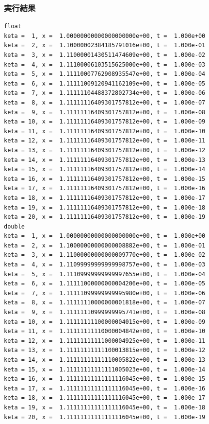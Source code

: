 \documentclass{jarticle}
\begin{document}
\subsubsection{実行結果\\}
\begin{breakbox}
\begin{verbatim}
float
keta =  1, x =  1.00000000000000000000e+00, t =  1.000e+00
keta =  2, x =  1.10000002384185791016e+00, t =  1.000e-01
keta =  3, x =  1.11000001430511474609e+00, t =  1.000e-02
keta =  4, x =  1.11100006103515625000e+00, t =  1.000e-03
keta =  5, x =  1.11110007762908935547e+00, t =  1.000e-04
keta =  6, x =  1.11111009120941162109e+00, t =  1.000e-05
keta =  7, x =  1.11111104488372802734e+00, t =  1.000e-06
keta =  8, x =  1.11111116409301757812e+00, t =  1.000e-07
keta =  9, x =  1.11111116409301757812e+00, t =  1.000e-08
keta = 10, x =  1.11111116409301757812e+00, t =  1.000e-09
keta = 11, x =  1.11111116409301757812e+00, t =  1.000e-10
keta = 12, x =  1.11111116409301757812e+00, t =  1.000e-11
keta = 13, x =  1.11111116409301757812e+00, t =  1.000e-12
keta = 14, x =  1.11111116409301757812e+00, t =  1.000e-13
keta = 15, x =  1.11111116409301757812e+00, t =  1.000e-14
keta = 16, x =  1.11111116409301757812e+00, t =  1.000e-15
keta = 17, x =  1.11111116409301757812e+00, t =  1.000e-16
keta = 18, x =  1.11111116409301757812e+00, t =  1.000e-17
keta = 19, x =  1.11111116409301757812e+00, t =  1.000e-18
keta = 20, x =  1.11111116409301757812e+00, t =  1.000e-19
double
keta =  1, x =  1.00000000000000000000e+00, t =  1.000e+00
keta =  2, x =  1.10000000000000008882e+00, t =  1.000e-01
keta =  3, x =  1.11000000000000009770e+00, t =  1.000e-02
keta =  4, x =  1.11099999999999998757e+00, t =  1.000e-03
keta =  5, x =  1.11109999999999997655e+00, t =  1.000e-04
keta =  6, x =  1.11111000000000004206e+00, t =  1.000e-05
keta =  7, x =  1.11111099999999995980e+00, t =  1.000e-06
keta =  8, x =  1.11111110000000001818e+00, t =  1.000e-07
keta =  9, x =  1.11111110999999995741e+00, t =  1.000e-08
keta = 10, x =  1.11111111100000004015e+00, t =  1.000e-09
keta = 11, x =  1.11111111110000004842e+00, t =  1.000e-10
keta = 12, x =  1.11111111111000004925e+00, t =  1.000e-11
keta = 13, x =  1.11111111111100013815e+00, t =  1.000e-12
keta = 14, x =  1.11111111111110005822e+00, t =  1.000e-13
keta = 15, x =  1.11111111111111005023e+00, t =  1.000e-14
keta = 16, x =  1.11111111111111116045e+00, t =  1.000e-15
keta = 17, x =  1.11111111111111116045e+00, t =  1.000e-16
keta = 18, x =  1.11111111111111116045e+00, t =  1.000e-17
keta = 19, x =  1.11111111111111116045e+00, t =  1.000e-18
keta = 20, x =  1.11111111111111116045e+00, t =  1.000e-19
\end{verbatim}
\end{breakbox}
\end{document}
